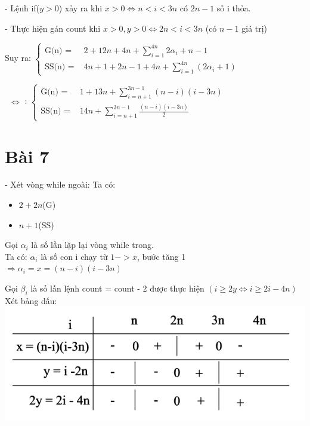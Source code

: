 \documentclass{article}
\newcommand\tab[1][1cm]{\hspace*{#1}}
\begin{document}
- Lệnh if($y>0$) xảy ra khi $x > 0 \Leftrightarrow n < i < 3n$ có $ 2n - 1$ số i thỏa.

- Thực hiện gán count khi $ x > 0, y> 0 \Leftrightarrow 2n < i < 3n $ (có $n-1$ giá trị) 

\vspace{5mm}
\tab Suy ra: 
\(
\begin{cases}
    \text{G(n) = } & 2 + 12n + 4n +  \sum\limits_{i=1}^{4n}{2\alpha_{i}} + n - 1 \\
    \text{SS(n) = } &  4n + 1 + 2n - 1 + 4n + \sum\limits_{i=1}^{4n}{(2\alpha_{i}+1)}
\end{cases}
\)

\vspace{5mm}
\tab\ $\Leftrightarrow$ : 
\(
\begin{cases}
    \text{G(n) = } & 1 + 13n + \sum\limits_{i=n+1}^{3n-1}{(n-i)(i-3n)}  \\
    \text{SS(n) = } &  14n  +\sum\limits_{i=n+1}^{3n-1}{\frac{(n-i)(i-3n)}{2}}
\end{cases}
\)
\section*{Bài 7}
- Xét vòng while ngoài:
Ta có:
\begin{itemize}
    \item $ 2+2n $(G)
    \item $ n + 1 $(SS)
\end{itemize}

Gọi $\alpha_{i}$ là số lần lặp lại vòng while trong.\\
Ta có: $\alpha_{i}$ là số con i chạy từ $ 1 -> x$, bước tăng 1 \\
\(\Rightarrow \alpha_{i} = x = (n-i)(i-3n) \)

Gọi $\beta_{i}$ là số lần lệnh count = count - 2 được thực hiện \((i \geq 2y \Leftrightarrow i \geq 2i - 4n )\)\\
Xét bảng dấu:\\
\includegraphics[scale=0.7]{BT/bangbai7}
\end{document}
